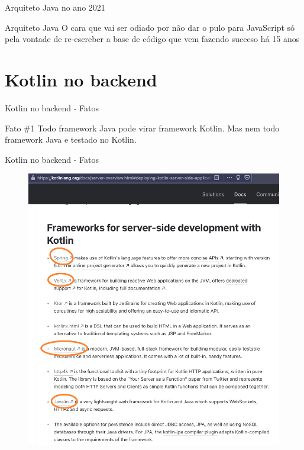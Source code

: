 \documentclass[aspectratio=169]{beamer}
\begin{document}
\begin{frame}{Arquiteto Java no ano 2021}

\begin{exampleblock}{Arquiteto Java}
O cara que vai ser odiado por não dar o pulo para JavaScript só pela vontade de re-escreber a base de código que vem fazendo succeso há 15 anos
\end{exampleblock}
\end{frame}

{
    \section{Kotlin no backend}
}


\begin{frame}{Kotlin no backend - Fatos}

\begin{exampleblock}{Fato \#1}
Todo framework Java pode virar framework Kotlin. Mas nem todo framework Java e testado no Kotlin.
\end{exampleblock}
\end{frame}

\begin{frame}{Kotlin no backend - Fatos}
\begin{figure}
	\centering
	\includegraphics[width=0.55\linewidth]{Images/fwkotlin}
\end{figure}
\end{frame}
\end{document}
